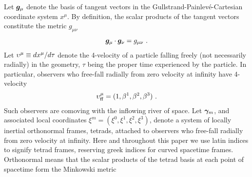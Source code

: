 \documentclass[twocolumn,showpacs,preprintnumbers,amsmath,amssymb,prb]{revtex4}
\begin{document}
Let $\bm{g}_\mu$ denote the basis of tangent vectors
in the Gullstrand-Painlev\'e-Cartesian coordinate system $x^\mu$.
By definition,
the scalar products of the tangent vectors constitute the metric $g_{\mu\nu}$
\begin{equation}
\label{gg}
  \bm{g}_\mu \cdot \bm{g}_\nu = g_{\mu\nu}
  \ .
\end{equation}
Let $\upsilon^{\mu} \equiv d x^{\mu} / d \tau$
denote the 4-velocity of a particle falling freely (not necessarily radially)
in the geometry,
$\tau$ being the proper time experienced by the particle.
%
In particular,
observers who free-fall radially from zero velocity at infinity
have 4-velocity
\begin{equation}
  \upsilon_{\rm ff}^\mu = (1, \beta^1, \beta^2, \beta^3)
  \ .
\end{equation}
Such observers are comoving with the inflowing river of space.
Let
$\bm{\gamma}_m$,
and associated local coordinates $\xi^m = (\xi^0,\xi^1,\xi^2,\xi^3)$,
denote a system of locally inertial orthonormal frames, tetrads,
attached to observers who free-fall radially from zero velocity at infinity.
Here and throughout this paper we use latin indices
to signify tetrad frames,
reserving greek indices for curved spacetime frames.
Orthonormal means that
the scalar products of the tetrad basis at each point of spacetime
form the Minkowski metric
\end{document}
